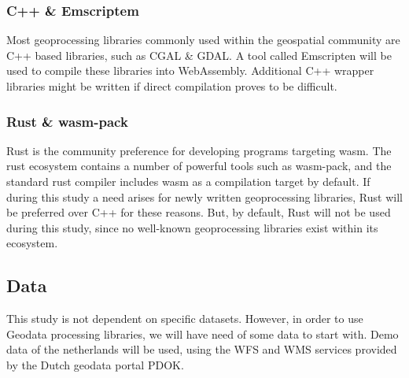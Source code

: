 \subsubsection*{C++ \& Emscriptem}
Most geoprocessing libraries commonly used within the geospatial community are C++ based libraries, such as CGAL \& GDAL. A tool called Emscripten will be used to compile these libraries into WebAssembly. Additional C++ wrapper libraries might be written if direct compilation proves to be difficult. 

\subsubsection*{Rust \& wasm-pack}
Rust is the community preference for developing programs targeting wasm. 
The rust ecosystem contains a number of powerful tools such as wasm-pack, and the standard rust compiler includes wasm as a compilation target by default. If during this study a need arises for newly written geoprocessing libraries, Rust will be preferred over C++ for these reasons. But, by default, Rust will not be used during this study, since no well-known geoprocessing libraries exist within its ecosystem.

\subsection{Data}
This study is not dependent on specific datasets. However, in order to use Geodata processing libraries, we will have need of some data to start with. Demo data of the netherlands will be used, using the WFS and WMS services provided by the Dutch geodata portal PDOK. 
